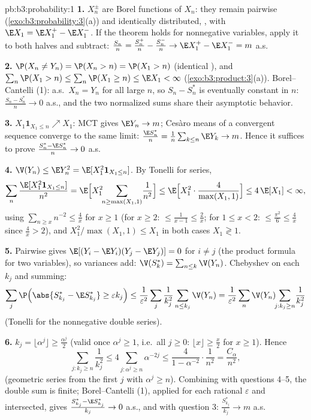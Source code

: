\begin{solution}{pb:b3:probability:1}
\textbf{1.} $X_n^{\pm}$ are Borel functions of $X_n$: they
remain pairwise 
(\cref{exo:b3:probability:3}(a)) and identically
distributed, , with $\E X_1 = \E X_1^+ - \E
X_1^-$. If the theorem holds for nonnegative variables,
apply it to both halves and subtract:
$\frac{S_n}n = \frac{S_n^+}n - \frac{S_n^-}n \to \E X_1^+ -
\E X_1^- = m$ a.s.

\textbf{2.} $\P(X_n \neq Y_n) = \P(X_n > n) = \P(X_1 > n)$
(identical ), and $\sum_n\P(X_1 > n) \leq \sum_n\P(X_1
\geq n) \leq \E X_1 < \infty$
(\cref{exo:b3:product:3}(a)). Borel--Cantelli (1): a.s.\
$X_n = Y_n$ for all large $n$, so $S_n - S_n^*$ is
eventually constant in $n$: $\frac{S_n - S_n^*}n \to 0$
a.s., and the two normalized sums share their asymptotic
behavior.

\textbf{3.} $X_1\mathbf 1_{X_1 \leq n} \nearrow X_1$: MCT
gives $\E Y_n \to m$; Ces\`aro means of a convergent
sequence converge to the same limit: $\frac{\E S_n^*}n =
\frac1n\sum_{k\leq n}\E Y_k \to m$. Hence it suffices to
prove $\frac{S^*_n - \E S^*_n}{n} \to 0$ a.s.

\textbf{4.} $\V(Y_n) \leq \E Y_n^2 = \E[X_1^2\mathbf
1_{X_1\leq n}]$. By Tonelli for series,
\[
\sum_n\frac{\E[X_1^2\mathbf 1_{X_1\leq n}]}{n^2}
= \E\Bigl[X_1^2\!\!\sum_{n \geq \max(X_1, 1)}\!\frac1{n^2}
\Bigr]
\leq \E\Bigl[X_1^2\cdot\frac{4}{\max(X_1,1)}\Bigr]
\leq 4\,\E[X_1] < \infty,
\]
using $\sum_{n\geq x}n^{-2} \leq \frac4x$ for $x \geq 1$
(for $x \geq 2$: $\leq \frac1{x-1} \leq \frac2x$; for $1
\leq x < 2$: $\leq \frac{\pi^2}6 \leq \frac4x$ since
$\frac4x > 2$), and $X_1^2/\max(X_1, 1) \leq X_1$ in both
cases $X_1 \gtrless 1$.

\textbf{5.} Pairwise  gives $\E[(Y_i - \E
Y_i)(Y_j - \E Y_j)] = 0$ for $i \neq j$ (the product
formula for two variables), so variances add: $\V(S^*_k) =
\sum_{n\leq k}\V(Y_n)$. Chebyshev on each $k_j$ and
summing:
\[
\sum_j\P\Bigl(\abs{S^*_{k_j} - \E S^*_{k_j}} \geq
\varepsilon k_j\Bigr)
\leq \frac1{\varepsilon^2}\sum_j\frac1{k_j^2}\sum_{n\leq
k_j}\V(Y_n)
= \frac1{\varepsilon^2}\sum_n\V(Y_n)\!\!\sum_{j : k_j\geq
n}\!\frac1{k_j^2}
\]
(Tonelli for the nonnegative double series).

\textbf{6.} $k_j = \lfloor\alpha^j\rfloor \geq
\frac{\alpha^j}2$ (valid once $\alpha^j \geq 1$, i.e.\ all
$j \geq 0$: $\lfloor x\rfloor \geq \frac x2$ for $x \geq
1$). Hence
\[
\sum_{j : k_j \geq n}\frac1{k_j^2}
\leq 4\sum_{j : \alpha^j \geq n}\alpha^{-2j}
\leq \frac{4}{1 - \alpha^{-2}}\cdot\frac1{n^2}
= \frac{C_\alpha}{n^2},
\]
(geometric series from the first $j$ with $\alpha^j \geq
n$). Combining with questions 4--5, the double sum is
finite; Borel--Cantelli (1), applied for each rational
$\varepsilon$ and intersected, gives
$\frac{S^*_{k_j} - \E S^*_{k_j}}{k_j} \to 0$ a.s., and with
question 3: $\frac{S^*_{k_j}}{k_j} \to m$ a.s.


\end{solution}
